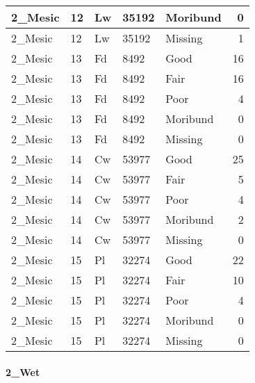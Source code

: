\documentclass[
]{article}
\begin{document}
\begin{tabular}{l|l|l|l|l|r}
\hline
2\_Mesic & 12 & Lw & 35192 & Moribund & 0\\
\hline
2\_Mesic & 12 & Lw & 35192 & Missing & 1\\
\hline
2\_Mesic & 13 & Fd & 8492 & Good & 16\\
\hline
2\_Mesic & 13 & Fd & 8492 & Fair & 16\\
\hline
2\_Mesic & 13 & Fd & 8492 & Poor & 4\\
\hline
2\_Mesic & 13 & Fd & 8492 & Moribund & 0\\
\hline
2\_Mesic & 13 & Fd & 8492 & Missing & 0\\
\hline
2\_Mesic & 14 & Cw & 53977 & Good & 25\\
\hline
2\_Mesic & 14 & Cw & 53977 & Fair & 5\\
\hline
2\_Mesic & 14 & Cw & 53977 & Poor & 4\\
\hline
2\_Mesic & 14 & Cw & 53977 & Moribund & 2\\
\hline
2\_Mesic & 14 & Cw & 53977 & Missing & 0\\
\hline
2\_Mesic & 15 & Pl & 32274 & Good & 22\\
\hline
2\_Mesic & 15 & Pl & 32274 & Fair & 10\\
\hline
2\_Mesic & 15 & Pl & 32274 & Poor & 4\\
\hline
2\_Mesic & 15 & Pl & 32274 & Moribund & 0\\
\hline
2\_Mesic & 15 & Pl & 32274 & Missing & 0\\
\hline
\end{tabular}

\hypertarget{wet-1}{%
\paragraph{2\_Wet}\label{wet-1}}
\end{document}
